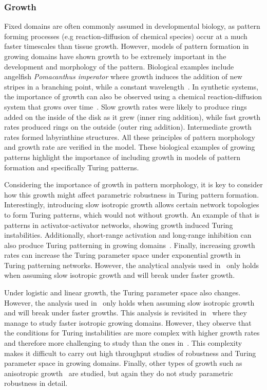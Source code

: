  \subsubsection{Growth}\label{growth_intro}
Fixed domains are often commonly assumed in developmental biology, as pattern forming processes (e.g reaction-diffusion of chemical species) occur at a much faster timescales than tissue growth. %
However, models of pattern formation in growing domains have shown growth to be extremely important in the development and morphology of the pattern.
Biological examples include angelﬁsh \textit{Pomacanthus imperator} where growth induces the addition of new stripes in a branching point, while a constant wavelength~\parencite{Kondo1995}.
In synthetic systems, the importance of growth can also be observed using a chemical reaction-diffusion system that grows over time~\parencite{Konow2019}.
Slow growth rates were likely to produce rings added on the inside of the disk as it grew (inner ring addition), while fast growth rates produced rings on the outside (outer ring addition).
Intermediate growth rates formed labyrinthine structures.
All these principles of pattern morphology and growth rate are verified in the model.
These biological examples of growing patterns highlight the importance of including growth in models of pattern formation and specifically Turing patterns.

Considering the importance of growth in pattern morphology, it is key to consider how this growth might affect parametric robustness in Turing pattern formation.
Interestingly, introducing slow isotropic growth allows certain network topologies to form Turing patterns, which would not without growth.
An example of that is patterns in activator-activator networks, showing growth induced Turing instabilities.
Additionally, short-range activation and long-range inhibition can also produce Turing patterning in growing domains~\cite{gaffney2010}.
Finally, increasing growth rates can increase the Turing parameter space under exponential growth in Turing patterning networks.
However, the analytical analysis used in~\cite{gaffney2010} only holds when assuming slow isotropic growth and will break under faster growth.

Under logistic and linear growth, the Turing parameter space also changes.
However, the analysis used in~\cite{gaffney2010} only holds when assuming slow isotropic growth and will break under faster growths.
This analysis is revisited in~\cite{Klika2017} where they manage to study faster isotropic growing domains.
However, they observe that the conditions for Turing instabilities are more complex with higher growth rates and therefore more challenging to study than the ones in~\cite{gaffney2010}.
This complexity makes it difficult to carry out high throughput studies of robustness and Turing parameter space in growing domains.
Finally, other types of growth such as anisotropic growth~\parencite{Krause2019} are studied, but again they do not study parametric robustness in detail.

